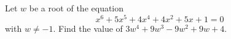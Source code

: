 Let $w$ be a root of the equation
\[
x^6+5x^5+4x^4+4x^2+5x+1=0
\]
with $w\ne-1$. Find the value of $3w^4+9w^3-9w^2+9w+4$.
